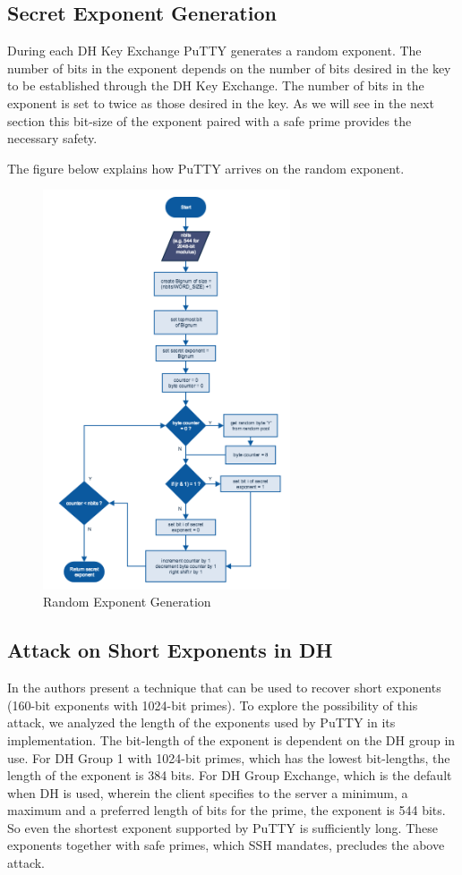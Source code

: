 \documentclass{bhamthesis}
\begin{document}
\subsection{Secret Exponent Generation}
During each DH Key Exchange PuTTY generates a random exponent. The number of bits in the exponent depends on the number of bits desired in the key to be established through the DH Key Exchange. The number of bits in the exponent is set to twice as those desired in the key. As we will see in the next section this bit-size of the exponent paired with a safe prime provides the necessary safety.\par
The figure below explains how PuTTY arrives on the random exponent.
\clearpage
\begin{figure}[ht]
\caption{Random Exponent Generation}
\centering
\includegraphics[width=0.65\textwidth]{Rand_Expo.png} 
\end{figure}
\subsection{Attack on Short Exponents in DH}
In \cite{oorschot96} the authors present a technique that can be used to recover short exponents (160-bit exponents with 1024-bit primes). To explore the possibility of this attack, we analyzed the length of the exponents used by PuTTY in its implementation. The bit-length of the exponent is dependent on the DH group in use. For DH Group 1 with 1024-bit primes, which has the lowest bit-lengths, the length of the exponent is 384 bits. For DH Group Exchange, which is the default when DH is used, wherein the client specifies to the server a minimum, a maximum and a preferred length of bits for the prime, the exponent is 544 bits. So even the shortest exponent supported by PuTTY is sufficiently long. These exponents together with safe primes, which SSH mandates, precludes the above attack.
\end{document}
